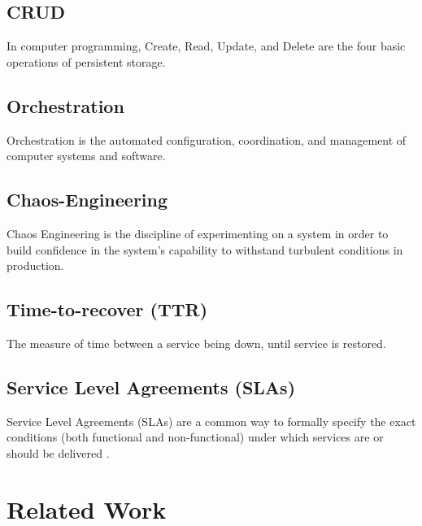 \section*{CRUD}
In computer programming, Create, Read, Update, and Delete are the four basic operations of persistent storage\cite{martin1983managing}.

\section*{Orchestration}
Orchestration is the automated configuration, coordination, and management of computer systems and software\cite{erl1900service}.

\section*{Chaos-Engineering}
Chaos Engineering is the discipline of experimenting on a system in order to build confidence in the system's capability to withstand turbulent conditions in production\cite{hochstein_2019}.

\section*{Time-to-recover (TTR)}
The measure of time between a service being down, until service is restored.

\section*{Service Level Agreements (SLAs)}
Service Level Agreements (SLAs) are a common way to formally specify the exact
conditions (both functional and non-functional) under which services are or should
be delivered \cite{wieder2011service}.


\chapter{Related Work}

